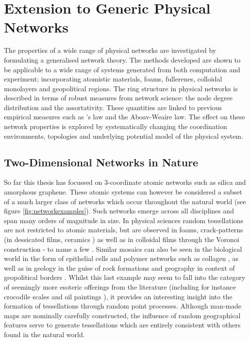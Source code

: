 \chapter[Extension to Generic Physical Networks]{Extension to Generic Physical \\ Networks}
\label{ch:generalnetworks}

\begin{chapterabstract}
The properties of a wide range of physical \td{} networks are investigated by formulating a generalised network theory.
The methods developed are shown to be applicable to a wide range of systems generated from both computation and experiment; incorporating atomistic materials, foams, fullerenes, colloidal monolayers and geopolitical regions.
The ring structure in physical networks is described in terms of robust measures from network science: the node degree distribution and the assortativity.
These quantities are linked to previous empirical measures such as \lm's law and the Aboav\--Weaire law.
The effect on these network properties is explored by systematically changing the coordination environments, topologies and underlying potential model of the physical system.
\end{chapterabstract}

\section{Two\--Dimensional Networks in Nature}

So far this thesis has focussed on 3\--coordinate atomic networks such as silica and amorphous graphene.
These atomic systems can however be considered a subset of a much larger class of \td{} networks which occur throughout the natural world (see figure \ref{fig:networkexamples}).
Such networks emerge across all disciplines and span many orders of magnitude in size.
In physical sciences random tessellations are not restricted to atomic materials, but are observed in foams, crack\--patterns  (in dessicated films, ceramics \etc) as well as in colloidal films through the Voronoi construction \-- to name a few \cite{Durand2011,Tong2017,Noever1992,Ma2019,Earnshaw1994,Allain1995,Moncho-Jorda2000}.
Similar mosaics can also be seen in the biological world in the form of epithelial cells and polymer networks such as collagen \cite{Honda1978,Carter2017,Kim2016,Broedersz2014}, as well as in geology in the guise of rock formations and geography in context of geopolitical borders \cite{Weaire1984,Goehring2014,LeCaer1993}.
Whilst this last example may seem to fall into the category of seemingly more esoteric offerings from the literature (including for instance crocodile scales and oil paintings \cite{Milinkovitch2019,Flores2017}), it provides an interesting insight into the formation of tessellations through random point processes.
Although man\--made maps are nominally carefully constructed, the influence of random geographical features serve to generate tessellations which are entirely consistent with others found in the natural world.

